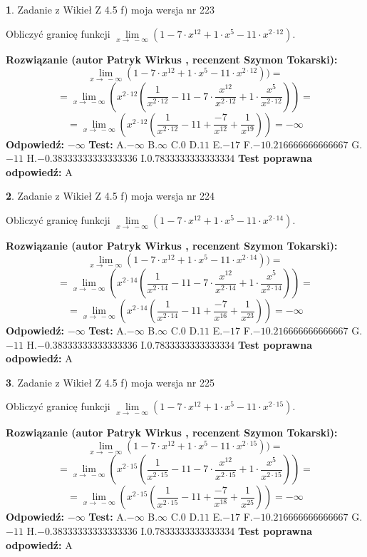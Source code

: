 \documentclass[12pt, a4paper]{article}
\theoremstyle{definition} %
\newtheorem{zad}{}
\newcommand{\zadStart}[1]{\begin{zad}#1\newline}
\newcommand{\zadStop}{\end{zad}}
\newcommand{\rozwStart}[2]{\noindent \textbf{Rozwiązanie (autor #1 , recenzent #2): }\newline}
\newcommand{\rozwStop}{\newline}
\newcommand{\odpStart}{\noindent \textbf{Odpowiedź:}\newline}
\newcommand{\odpStop}{\newline}
\newcommand{\testStart}{\noindent \textbf{Test:}\newline}
\newcommand{\testStop}{\newline}
\newcommand{\kluczStart}{\noindent \textbf{Test poprawna odpowiedź:}\newline}
\newcommand{\kluczStop}{\newline}
\begin{document}
\zadStart{Zadanie z Wikieł Z 4.5 f) moja wersja nr 223}


Obliczyć granicę funkcji  $\lim\limits_{x\to\ -\infty}(1 - 7 \cdot x^{12}+1 \cdot x^{5}- 11 \cdot x^{2\cdot12})$.
\zadStop
\rozwStart{Patryk Wirkus}{Szymon Tokarski}
$$\lim\limits_{x\to\ -\infty}(1 - 7 \cdot x^{12}+1 \cdot x^{5}- 11 \cdot x^{2\cdot12}))=$$
$$=\lim\limits_{x\to\ -\infty}(x^{2\cdot12}(\frac{1}{x^{2\cdot12}}-11 -7 \cdot \frac{x^{12}}{x^{2\cdot12}}+1 \cdot \frac{x^{5}}{x^{2\cdot12}}))=$$
$$=\lim\limits_{x\to\ -\infty}(x^{2\cdot12}(\frac{1}{x^{2\cdot12}}-11 + \frac{-7}{x^{12}}+ \frac{1}{x^{19}}))=-\infty$$
\rozwStop
\odpStart
$-\infty$
\odpStop
\testStart
A.$-\infty$ B.$\infty$ C.$0$ D.$11$ E.$-17$
F.$-10.216666666666667$ G.$-11$
H.$-0.38333333333333336$
I.$0.7833333333333334$
\testStop
\kluczStart
A
\kluczStop



\zadStart{Zadanie z Wikieł Z 4.5 f) moja wersja nr 224}


Obliczyć granicę funkcji  $\lim\limits_{x\to\ -\infty}(1 - 7 \cdot x^{12}+1 \cdot x^{5}- 11 \cdot x^{2\cdot14})$.
\zadStop
\rozwStart{Patryk Wirkus}{Szymon Tokarski}
$$\lim\limits_{x\to\ -\infty}(1 - 7 \cdot x^{12}+1 \cdot x^{5}- 11 \cdot x^{2\cdot14}))=$$
$$=\lim\limits_{x\to\ -\infty}(x^{2\cdot14}(\frac{1}{x^{2\cdot14}}-11 -7 \cdot \frac{x^{12}}{x^{2\cdot14}}+1 \cdot \frac{x^{5}}{x^{2\cdot14}}))=$$
$$=\lim\limits_{x\to\ -\infty}(x^{2\cdot14}(\frac{1}{x^{2\cdot14}}-11 + \frac{-7}{x^{16}}+ \frac{1}{x^{23}}))=-\infty$$
\rozwStop
\odpStart
$-\infty$
\odpStop
\testStart
A.$-\infty$ B.$\infty$ C.$0$ D.$11$ E.$-17$
F.$-10.216666666666667$ G.$-11$
H.$-0.38333333333333336$
I.$0.7833333333333334$
\testStop
\kluczStart
A
\kluczStop



\zadStart{Zadanie z Wikieł Z 4.5 f) moja wersja nr 225}


Obliczyć granicę funkcji  $\lim\limits_{x\to\ -\infty}(1 - 7 \cdot x^{12}+1 \cdot x^{5}- 11 \cdot x^{2\cdot15})$.
\zadStop
\rozwStart{Patryk Wirkus}{Szymon Tokarski}
$$\lim\limits_{x\to\ -\infty}(1 - 7 \cdot x^{12}+1 \cdot x^{5}- 11 \cdot x^{2\cdot15}))=$$
$$=\lim\limits_{x\to\ -\infty}(x^{2\cdot15}(\frac{1}{x^{2\cdot15}}-11 -7 \cdot \frac{x^{12}}{x^{2\cdot15}}+1 \cdot \frac{x^{5}}{x^{2\cdot15}}))=$$
$$=\lim\limits_{x\to\ -\infty}(x^{2\cdot15}(\frac{1}{x^{2\cdot15}}-11 + \frac{-7}{x^{18}}+ \frac{1}{x^{25}}))=-\infty$$
\rozwStop
\odpStart
$-\infty$
\odpStop
\testStart
A.$-\infty$ B.$\infty$ C.$0$ D.$11$ E.$-17$
F.$-10.216666666666667$ G.$-11$
H.$-0.38333333333333336$
I.$0.7833333333333334$
\testStop
\kluczStart
A
\kluczStop
\end{document}
